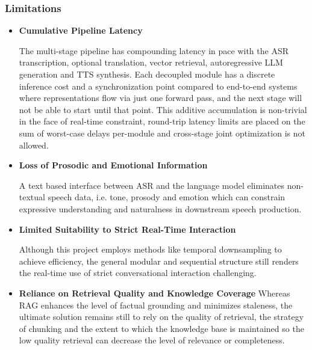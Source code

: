     \subsubsection{Limitations}
    \begin{itemize}
        \item \textbf{Cumulative Pipeline Latency} 
        
The multi-stage pipeline has compounding latency in pace with the ASR transcription, optional translation, vector retrieval, autoregressive LLM generation and TTS synthesis. Each decoupled module has a discrete inference cost and a synchronization point compared to end-to-end systems where representations flow via just one forward pass, and the next stage will not be able to start until that point. This additive accumulation is non-trivial in the face of real-time constraint, round-trip latency limits are placed on the sum of worst-case delays per-module and cross-stage joint optimization is not allowed.
        
        
        \item \textbf{Loss of Prosodic and Emotional Information}
        
A text based interface between ASR and the language model eliminates non-textual speech data, i.e. tone, prosody and emotion which can constrain expressive understanding and naturalness in downstream speech production.

        \item \textbf{Limited Suitability to Strict Real-Time Interaction}
         
 Although this project employs methods like temporal downsampling to achieve efficiency, the general modular and sequential structure still renders the real-time use of strict conversational interaction challenging.

        \item \textbf{Reliance on Retrieval Quality and Knowledge Coverage} 
Whereas RAG enhances the level of factual grounding and minimizes staleness, the ultimate solution remains still to rely on the quality of retrieval, the strategy of chunking and the extent to which the knowledge base is maintained so the low quality retrieval can decrease the level of relevance or completeness.

    \end{itemize}

\pagebreak
